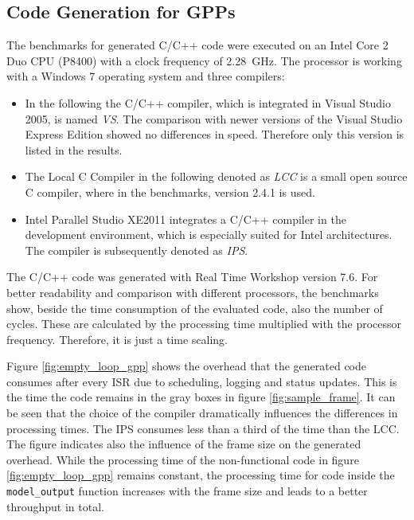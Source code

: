\subsection{Code Generation for GPPs}

The benchmarks for generated C/C++ code were executed on an Intel Core 2 Duo CPU (P8400) with a clock frequency of \SI{2.28}{GHz}. The processor is working with a Windows 7 operating system and three compilers:
\begin{itemize}
	\item In the following the C/C++ compiler, which is integrated in Visual Studio 2005, is named \emph{VS}. The comparison with newer versions of the Visual Studio Express Edition showed no differences in speed. Therefore only this version is listed in the results.
	\item The Local C Compiler in the following denoted as \emph{LCC} is a small open source C compiler, where in the benchmarks, version 2.4.1 is used.   
	\item Intel Parallel Studio XE2011 integrates a C/C++ compiler in the development environment, which is especially suited for Intel architectures. The compiler is subsequently denoted as \emph{IPS}.
\end{itemize}

The C/C++ code was generated with Real Time Workshop version 7.6. For better readability and comparison with different processors, the benchmarks show, beside the time consumption of the evaluated code, also the number of cycles. These are calculated by the processing time multiplied with the processor frequency. Therefore, it is just a time scaling.

Figure \ref{fig:empty_loop_gpp} shows the overhead that the generated code consumes after every \ac{ISR} due to scheduling, logging and status updates. This is the time the code remains in the gray boxes in figure \ref{fig:sample_frame}. It can be seen that the choice of the compiler dramatically influences the differences in processing times. The \ac{IPS} consumes less than a third of the time than the \ac{LCC}. The figure indicates also the influence of the frame size on the generated overhead. While the processing time of the non-functional code in figure \ref{fig:empty_loop_gpp} remains constant, the processing time for code inside the \texttt{model\_output} function increases with the frame size and leads to a better throughput in total.

